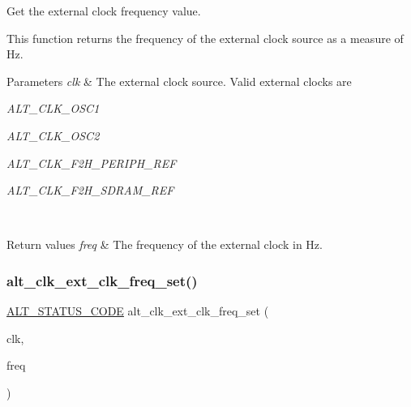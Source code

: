 Get the external clock frequency value.

This function returns the frequency of the external clock source as a measure of Hz.


\begin{DoxyParams}{Parameters}
{\em clk} & The external clock source. Valid external clocks are
\begin{DoxyItemize}
\item {\itshape A\+L\+T\+\_\+\+C\+L\+K\+\_\+\+O\+S\+C1} 
\item {\itshape A\+L\+T\+\_\+\+C\+L\+K\+\_\+\+O\+S\+C2} 
\item {\itshape A\+L\+T\+\_\+\+C\+L\+K\+\_\+\+F2\+H\+\_\+\+P\+E\+R\+I\+P\+H\+\_\+\+R\+EF} 
\item {\itshape A\+L\+T\+\_\+\+C\+L\+K\+\_\+\+F2\+H\+\_\+\+S\+D\+R\+A\+M\+\_\+\+R\+EF} 
\end{DoxyItemize}\\
\hline
\end{DoxyParams}

\begin{DoxyRetVals}{Return values}
{\em freq} & The frequency of the external clock in Hz. \\
\hline
\end{DoxyRetVals}
\mbox{\label{group__CLK__MGR__FREQ_ga994a419c4cb7d4853dcc005d6c10cba0}} 
\subsubsection{\texorpdfstring{alt\_clk\_ext\_clk\_freq\_set()}{alt\_clk\_ext\_clk\_freq\_set()}}
{\footnotesize\ttfamily \mbox{\hyperlink{hwlib_8h_abdb0d369f069723ca55d6c94bcaaaa12}{A\+L\+T\+\_\+\+S\+T\+A\+T\+U\+S\+\_\+\+C\+O\+DE}} alt\+\_\+clk\+\_\+ext\+\_\+clk\+\_\+freq\+\_\+set (\begin{DoxyParamCaption}\item[{\mbox{\hyperlink{group__CLK__MGR_ga4cdb80e84284365fe3d47c2f8050b13d}{A\+L\+T\+\_\+\+C\+L\+K\+\_\+t}}}]{clk,  }\item[{\mbox{\hyperlink{group__CLK__MGR_gaa32fe6dfaa6def16098e0039eb336383}{alt\+\_\+freq\+\_\+t}}}]{freq }\end{DoxyParamCaption})}

